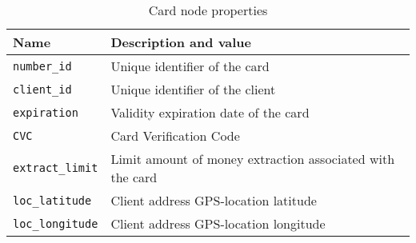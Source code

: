 \begin{table}[H]
    \centering
    \begin{tabular}{|l|l|}
    \hline
    \textbf{Name}        & \textbf{Description and value}                                          \\ \hline
    \texttt{number\_id}   & Unique identifier of the card                                 \\ \hline
    \texttt{client\_id}   & Unique identifier of the client                               \\ \hline
    \texttt{expiration}   & Validity expiration date of the card                          \\ \hline
    \texttt{CVC}          & Card Verification Code                                        \\ \hline
    \texttt{extract\_limit} & Limit amount of money extraction associated with the card    \\ \hline
    \texttt{loc\_latitude}  & Client address GPS-location latitude                         \\ \hline
    \texttt{loc\_longitude} & Client address GPS-location longitude                        \\ \hline
    \end{tabular}
    \caption{Card node properties}
    \label{table:card-node-properties}
\end{table}